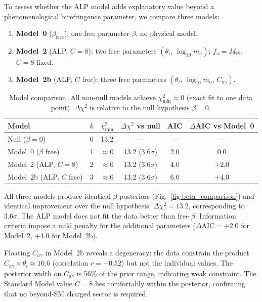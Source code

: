 To assess whether the ALP model adds explanatory value beyond a
phenomenological birefringence parameter, we compare three models:

\begin{enumerate}
\item \textbf{Model~0} ($\beta_\mathrm{free}$): one free parameter $\beta$,
  no physical model.

\item \textbf{Model~2} (ALP, $C = 8$): two free parameters
  $(\theta_i,\,\log_{10} m_a)$; $f_a = M_\mathrm{Pl}$, $C = 8$ fixed.

\item \textbf{Model~2b} (ALP, $C$ free): three free parameters
  $(\theta_i,\,\log_{10} m_a,\,C_{a\gamma})$.
\end{enumerate}

\begin{table}[h]
\centering
\caption{Model comparison.  All non-null models achieve $\chi^2_\mathrm{min}
  \approx 0$ (exact fit to one data point).  $\Delta\chi^2$ is relative to the
  null hypothesis $\beta = 0$.}
\label{tab:model_comparison}
\begin{tabular}{lccccc}
\hline\hline
Model & $k$ & $\chi^2_\mathrm{min}$ & $\Delta\chi^2$ vs null & AIC & $\Delta$AIC vs Model~0 \\
\hline
Null ($\beta = 0$)    & 0 & 13.2 & ---  & ---  & --- \\
Model~0 ($\beta$ free) & 1 & $\approx 0$ & 13.2 (3.6$\sigma$) & 2.0  & 0.0 \\
Model~2 (ALP, $C{=}8$) & 2 & $\approx 0$ & 13.2 (3.6$\sigma$) & 4.0  & $+2.0$ \\
Model~2b (ALP, $C$ free) & 3 & $\approx 0$ & 13.2 (3.6$\sigma$) & 6.0  & $+4.0$ \\
\hline\hline
\end{tabular}
\end{table}

\noindent All three models produce identical $\beta$ posteriors
(Fig.~\ref{fig:beta_comparison}) and identical improvement over the null
hypothesis: $\Delta\chi^2 = 13.2$, corresponding to $3.6\sigma$.  The ALP
model does not fit the data better than free $\beta$.  Information criteria
impose a mild penalty for the additional parameters ($\Delta\mathrm{AIC} =
+2.0$ for Model~2, $+4.0$ for Model~2b).

Floating $C_{a\gamma}$ in Model~2b reveals a degeneracy: the data constrain
the product $C_{a\gamma} \times \theta_i \approx 10.6$ (correlation
$r = -0.52$) but not the individual values.  The posterior width on $C_{a\gamma}$
is 56\% of the prior range, indicating weak constraint.  The Standard Model
value $C = 8$ lies comfortably within the posterior, confirming that no
beyond-SM charged sector is required.


